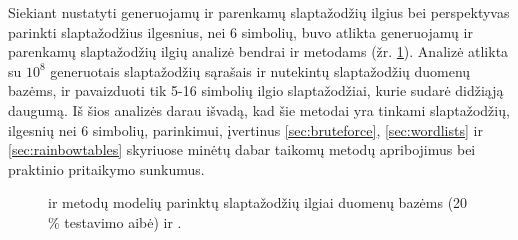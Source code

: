 \documentclass{VUMIFInfBakalaurinis}
\begin{document}
Siekiant nustatyti generuojamų ir parenkamų slaptažodžių ilgius bei perspektyvas 
parinkti slaptažodžius ilgesnius, nei 6 simbolių, buvo atlikta generuojamų ir 
parenkamų slaptažodžių ilgių analizė bendrai  ir 
 metodams (žr. \ref{plot:picked-lengths}). Analizė atlikta su 
$10^8$ generuotais slaptažodžių sąrašais  ir 
 nutekintų slaptažodžių duomenų bazėms, ir pavaizduoti tik 
5-16 simbolių ilgio slaptažodžiai, kurie sudarė didžiąją daugumą. Iš šios 
analizės darau išvadą, kad šie metodai yra tinkami slaptažodžių, ilgesnių nei 6 
simbolių, parinkimui, įvertinus \ref{sec:bruteforce}, \ref{sec:wordlists} ir 
\ref{sec:rainbowtables} skyriuose minėtų dabar taikomų metodų apribojimus bei 
praktinio pritaikymo sunkumus.
\begin{figure}[!ht]
  \begin{center}
  \end{center}
  \caption{
     ir  metodų modelių parinktų slaptažodžių 
    ilgiai duomenų bazėms  (20 \% testavimo aibė) ir 
    .
  }
  \label{plot:picked-lengths}
\end{figure}
\end{document}
